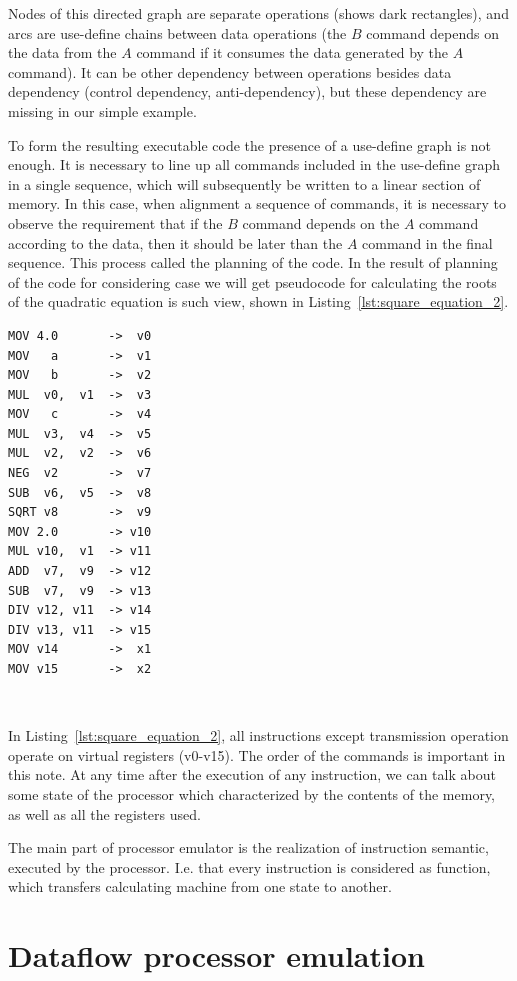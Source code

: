 \documentclass[
11pt,%
tightenlines,%
twoside,%
onecolumn,%
nofloats,%
nobibnotes,%
nofootinbib,%
superscriptaddress,%
noshowpacs,%
centertags]%
{revtex4}
\begin{document}
Nodes of this directed graph are separate operations (shows dark rectangles), and arcs are use-define chains between data operations (the $B$ command depends on the data from the $A$ command if it consumes the data generated by the $A$ command). It can be other dependency between operations besides data dependency (control dependency, anti-dependency), but these dependency are missing in our simple example.

To form the resulting executable code the presence of a use-define graph is not enough. It is necessary to line up all commands included in the use-define graph in a single sequence, which will subsequently be written to a linear section of memory. In this case, when alignment a sequence of commands, it is necessary to observe the requirement that if the $B$ command depends on the $A$ command according to the data, then it should be later than the $A$ command in the final sequence. This process called the planning of the code\cite{Aho}.
In the result of planning of the code for considering case we will get pseudocode for calculating the roots of the quadratic equation is such view, shown in Listing~\ref{lst:square_equation_2}.

\begin{lstlisting}[caption={Pseudocode for calculating the roots of a quadratic equation.},label={lst:square_equation_2}]
MOV 4.0       ->  v0
MOV   a       ->  v1
MOV   b       ->  v2
MUL  v0,  v1  ->  v3
MOV   c       ->  v4
MUL  v3,  v4  ->  v5
MUL  v2,  v2  ->  v6
NEG  v2       ->  v7
SUB  v6,  v5  ->  v8
SQRT v8       ->  v9
MOV 2.0       -> v10
MUL v10,  v1  -> v11
ADD  v7,  v9  -> v12
SUB  v7,  v9  -> v13
DIV v12, v11  -> v14
DIV v13, v11  -> v15
MOV v14       ->  x1
MOV v15       ->  x2
\end{lstlisting}

\

In Listing~\ref{lst:square_equation_2}, all instructions except transmission operation operate on virtual registers (v0-v15). The order of the commands is important in this note. At any time after the execution of any instruction, we can talk about some state of the processor which characterized by the contents of the memory, as well as all the registers used.

The main part of processor emulator is the realization of instruction semantic, executed by the processor. I.e. that every instruction is considered as function, which transfers calculating machine from one state to another.

\section{Dataflow processor emulation}
\end{document}
